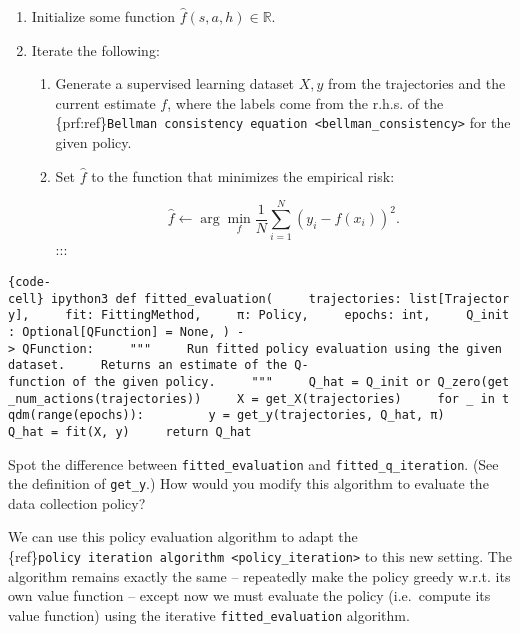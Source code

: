 \begin{enumerate}
\def\labelenumi{\arabic{enumi}.}
\tightlist
\item
  Initialize some function \(\hat f(s, a, h) \in \mathbb{R}\).
\item
  Iterate the following:

  \begin{enumerate}
  \def\labelenumii{\arabic{enumii}.}
  \item
    Generate a supervised learning dataset \(X, y\) from the
    trajectories and the current estimate \(f\), where the labels come
    from the r.h.s. of the
    \{prf:ref\}\texttt{Bellman\ consistency\ equation\ \textless{}bellman\_consistency\textgreater{}}
    for the given policy.
  \item
    Set \(\hat f\) to the function that minimizes the empirical risk:

    \[\hat f \gets \arg\min_f \frac{1}{N} \sum_{i=1}^N (y_i - f(x_i))^2.\]
    :::
  \end{enumerate}
\end{enumerate}

\texttt{\{code-cell\}\ ipython3\ def\ fitted\_evaluation(\ \ \ \ \ trajectories:\ list{[}Trajectory{]},\ \ \ \ \ fit:\ FittingMethod,\ \ \ \ \ π:\ Policy,\ \ \ \ \ epochs:\ int,\ \ \ \ \ Q\_init:\ Optional{[}QFunction{]}\ =\ None,\ )\ -\textgreater{}\ QFunction:\ \ \ \ \ """\ \ \ \ \ Run\ fitted\ policy\ evaluation\ using\ the\ given\ dataset.\ \ \ \ \ Returns\ an\ estimate\ of\ the\ Q-function\ of\ the\ given\ policy.\ \ \ \ \ """\ \ \ \ \ Q\_hat\ =\ Q\_init\ or\ Q\_zero(get\_num\_actions(trajectories))\ \ \ \ \ X\ =\ get\_X(trajectories)\ \ \ \ \ for\ \_\ in\ tqdm(range(epochs)):\ \ \ \ \ \ \ \ \ y\ =\ get\_y(trajectories,\ Q\_hat,\ π)\ \ \ \ \ \ \ \ \ Q\_hat\ =\ fit(X,\ y)\ \ \ \ \ return\ Q\_hat}

Spot the difference between \texttt{fitted\_evaluation} and
\texttt{fitted\_q\_iteration}. (See the definition of \texttt{get\_y}.)
How would you modify this algorithm to evaluate the data collection
policy?

We can use this policy evaluation algorithm to adapt the
\{ref\}\texttt{policy\ iteration\ algorithm\ \textless{}policy\_iteration\textgreater{}}
to this new setting. The algorithm remains exactly the same --
repeatedly make the policy greedy w.r.t. its own value function --
except now we must evaluate the policy (i.e.~compute its value function)
using the iterative \texttt{fitted\_evaluation} algorithm.


